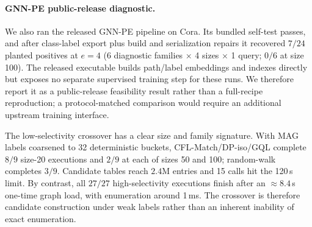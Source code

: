 \documentclass[runningheads]{llncs}
\begin{document}
\paragraph{GNN-PE public-release diagnostic.}
We also ran the released GNN-PE pipeline on Cora. Its bundled self-test passes, and after class-label export plus build and serialization repairs it recovered $7/24$ planted positives at $e=4$ (6 diagnostic families $\times$ 4 sizes $\times$ 1 query; $0/6$ at size 100). The released executable builds path/label embeddings and indexes directly but exposes no separate supervised training step for these runs. We therefore report it as a public-release feasibility result rather than a full-recipe reproduction; a protocol-matched comparison would require an additional upstream training interface.

\begin{table}[H]
\centering
\caption{\textbf{External baselines on planted queries}, complementing the internal retrieval-policy comparison of Table~\ref{tab:production_matrix}. \emph{Direct} is the CP-based Glasgow solver with no retrieval; \emph{GNN-PE} is the released public implementation on Cora (Section~\ref{sec:limits}). Classical filter-and-verify matchers (CFL-Match, DP-iso, GQL) solve Cora/Arxiv and solve MAG \emph{once the whole graph is loaded} at high label selectivity, but require the full graph resident and collapse at coarse labels.}
\label{tab:external}
\small
{}
\end{table}

The low-selectivity crossover has a clear size and family signature. With MAG labels coarsened to 32 deterministic buckets, CFL-Match/DP-iso/GQL complete $8/9$ size-20 executions and $2/9$ at each of sizes 50 and 100; random-walk completes $3/9$. Candidate tables reach $2.4$M entries and 15 calls hit the 120\,s limit. By contrast, all $27/27$ high-selectivity executions finish after an ${\approx}8.4$\,s one-time graph load, with enumeration around 1\,ms. The crossover is therefore candidate construction under weak labels rather than an inherent inability of exact enumeration.
\end{document}
